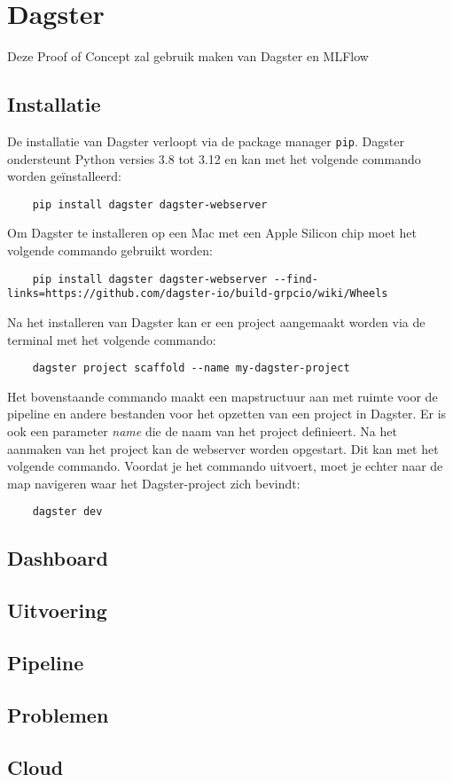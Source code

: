\section{Dagster}
Deze Proof of Concept zal gebruik maken van Dagster en MLFlow
\subsection{Installatie}
De installatie van Dagster verloopt via de package manager \texttt{pip}. Dagster ondersteunt Python versies 3.8 tot 3.12 en kan met het volgende commando worden geïnstalleerd:
\begin{verbatim}
    pip install dagster dagster-webserver
\end{verbatim}
Om Dagster te installeren op een Mac met een Apple Silicon chip moet het volgende commando gebruikt worden:
\begin{verbatim}
    pip install dagster dagster-webserver --find-links=https://github.com/dagster-io/build-grpcio/wiki/Wheels
\end{verbatim}

Na het installeren van Dagster kan er een project aangemaakt worden via de terminal met het volgende commando:
\begin{verbatim}
    dagster project scaffold --name my-dagster-project
\end{verbatim}
Het bovenstaande commando maakt een mapstructuur aan met ruimte voor de pipeline en andere bestanden voor het opzetten van een project in Dagster. Er is ook een parameter \textit{name} die de naam van het project definieert.
Na het aanmaken van het project kan de webserver worden opgestart. Dit kan met het volgende commando. Voordat je het commando uitvoert, moet je echter naar de map navigeren waar het Dagster-project zich bevindt:
\begin{verbatim}
    dagster dev
\end{verbatim}
\subsection{Dashboard}
\subsection{Uitvoering}
\subsection{Pipeline}
\subsection{Problemen}
\subsection{Cloud}
